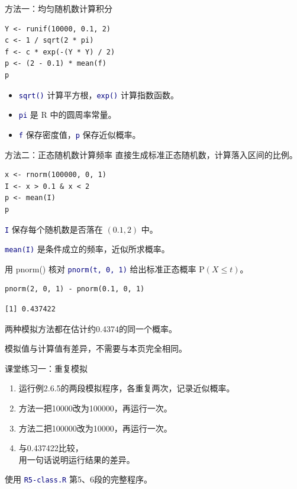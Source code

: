 \documentclass[14pt,compress,t,noamsthm,notheorem,table,handout,fontset=none]{ctexbeamer}
\newcommand{\code}[1]{\textcolor{navy}{\texttt{#1}}}
\newcommand{\inputlabel}{\par\smallskip{\fontsize{10.5}{13}\selectfont\bfseries\color{muted}输入代码\par}}
\newcommand{\outputlabel}{\par\smallskip{\fontsize{10.5}{13}\selectfont\bfseries\color{muted}Console 输出\par}}
\begin{document}
\begin{frame}[fragile]{方法一：均匀随机数计算积分}
  \inputlabel
\begin{lstlisting}
Y <- runif(10000, 0.1, 2)
c <- 1 / sqrt(2 * pi)
f <- c * exp(-(Y * Y) / 2)
p <- (2 - 0.1) * mean(f)
p
\end{lstlisting}
  \begin{itemize}
    \item \code{sqrt()} 计算平方根，\code{exp()} 计算指数函数。
    \item \code{pi} 是 R 中的圆周率常量。
    \item \code{f} 保存密度值，\code{p} 保存近似概率。
  \end{itemize}
\end{frame}

\begin{frame}[fragile]{方法二：正态随机数计算频率}
  直接生成标准正态随机数，计算落入区间的比例。
  \inputlabel
\begin{lstlisting}
x <- rnorm(100000, 0, 1)
I <- x > 0.1 & x < 2
p <- mean(I)
p
\end{lstlisting}
  \code{I} 保存每个随机数是否落在 $(0.1,2)$ 中。\par\smallskip
  \code{mean(I)} 是条件成立的频率，近似所求概率。
\end{frame}

\begin{frame}[fragile]{用 pnorm() 核对}
  \code{pnorm(t, 0, 1)} 给出标准正态概率 $\mathrm{P}(X\leq t)$。
  \inputlabel
\begin{lstlisting}
pnorm(2, 0, 1) - pnorm(0.1, 0, 1)
\end{lstlisting}
  \outputlabel
\begin{lstlisting}[style=output]
[1] 0.437422
\end{lstlisting}
  两种模拟方法都在估计约0.4374的同一个概率。\par\smallskip
  模拟值与计算值有差异，不需要与本页完全相同。
\end{frame}

\begin{frame}{课堂练习一：重复模拟}
  \begin{enumerate}
    \item 运行例2.6.5的两段模拟程序，各重复两次，记录近似概率。
    \item 方法一把10000改为100000，再运行一次。
    \item 方法二把100000改为10000，再运行一次。
    \item 与0.437422比较，\\
      用一句话说明运行结果的差异。
  \end{enumerate}
  \medskip
  使用 \code{R5-class.R} 第5、6段的完整程序。
\end{frame}
\end{document}
